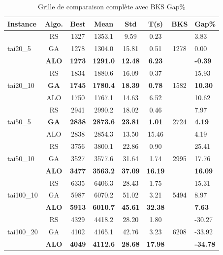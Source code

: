 \documentclass[12pt,a4paper,twoside]{report}
\begin{document}
\begin{table}[H]
\centering
{}
\caption{Grille de comparaison complète avec BKS Gap\%}
\label{tab:grid}
\small
\begin{tabular}{lccccccl}
\toprule
\rowcolor{TableHeader}
\color{white}Instance & \color{white}Algo. & \color{white}Best & \color{white}Mean & \color{white}Std & \color{white}T(s) & \color{white}BKS & \color{white}Gap\% \\
\midrule
\multirow{3}{*}{tai20\_5}
 & RS  & 1327 & 1353.1 & 9.59  & 0.23 & \multirow{3}{*}{1278} & 3.83 \\
 & GA  & 1278 & 1304.0 & 15.81 & 0.51 & & 0.00 \\
 & \textbf{ALO} & \textbf{1273} & \textbf{1291.0} & \textbf{12.48} & \textbf{6.23} & & \textbf{-0.39} \\
\midrule
\multirow{3}{*}{tai20\_10}
 & RS  & 1834 & 1880.6 & 16.09 & 0.37 & \multirow{3}{*}{1582} & 15.93 \\
 & \textbf{GA} & \textbf{1745} & \textbf{1780.4} & \textbf{18.39} & \textbf{0.78} & & \textbf{10.30} \\
 & ALO & 1750 & 1767.1 & 14.63 & 6.52 & & 10.62 \\
\midrule
\multirow{3}{*}{tai50\_5}
 & RS  & 2941 & 2990.2 & 18.02 & 0.46 & \multirow{3}{*}{2724} & 7.97 \\
 & \textbf{GA} & \textbf{2838} & \textbf{2873.6} & \textbf{23.81} & \textbf{1.01} & & \textbf{4.19} \\
 & ALO & 2838 & 2854.3 & 13.50 & 15.46 & & 4.19 \\
\midrule
\multirow{3}{*}{tai50\_10}
 & RS  & 3756 & 3800.1 & 22.86 & 0.90 & \multirow{3}{*}{2995} & 25.41 \\
 & GA  & 3527 & 3577.6 & 31.64 & 1.74 & & 17.76 \\
 & \textbf{ALO} & \textbf{3477} & \textbf{3563.2} & \textbf{37.09} & \textbf{16.19} & & \textbf{16.09} \\
\midrule
\multirow{3}{*}{tai100\_10}
 & RS  & 6335 & 6406.3 & 28.43 & 1.75 & \multirow{3}{*}{5494} & 15.31 \\
 & GA  & 5987 & 6070.2 & 51.02 & 3.21 & & 8.97 \\
 & \textbf{ALO} & \textbf{5913} & \textbf{6010.7} & \textbf{45.61} & \textbf{32.38} & & \textbf{7.63} \\
\midrule
\multirow{3}{*}{tai100\_20}
 & RS  & 4329 & 4418.2 & 28.20 & 1.80 & \multirow{3}{*}{6208} & -30.27 \\
 & GA  & 4102 & 4165.1 & 42.76 & 3.23 & & -33.92 \\
 & \textbf{ALO} & \textbf{4049} & \textbf{4112.6} & \textbf{28.68} & \textbf{17.98} & & \textbf{-34.78} \\
\bottomrule
\end{tabular}
\end{table}
\end{document}
